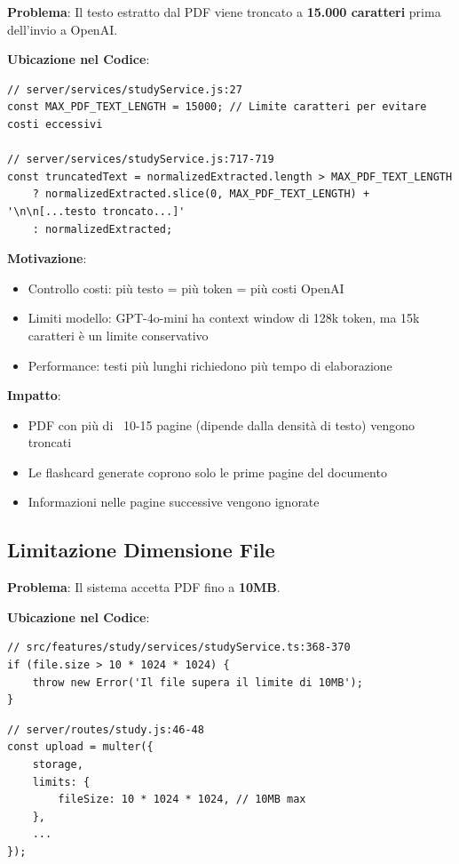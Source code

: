\documentclass[11pt,a4paper]{article}
\begin{document}
\textbf{Problema}: Il testo estratto dal PDF viene troncato a \textbf{15.000 caratteri} prima dell'invio a OpenAI.

\textbf{Ubicazione nel Codice}:
\begin{lstlisting}[caption=Costante e Troncamento Testo]
// server/services/studyService.js:27
const MAX_PDF_TEXT_LENGTH = 15000; // Limite caratteri per evitare costi eccessivi

// server/services/studyService.js:717-719
const truncatedText = normalizedExtracted.length > MAX_PDF_TEXT_LENGTH 
    ? normalizedExtracted.slice(0, MAX_PDF_TEXT_LENGTH) + '\n\n[...testo troncato...]'
    : normalizedExtracted;
\end{lstlisting}

\textbf{Motivazione}:
\begin{itemize}
    \item Controllo costi: più testo = più token = più costi OpenAI
    \item Limiti modello: GPT-4o-mini ha context window di 128k token, ma 15k caratteri è un limite conservativo
    \item Performance: testi più lunghi richiedono più tempo di elaborazione
\end{itemize}

\textbf{Impatto}:
\begin{itemize}
    \item PDF con più di ~10-15 pagine (dipende dalla densità di testo) vengono troncati
    \item Le flashcard generate coprono solo le prime pagine del documento
    \item Informazioni nelle pagine successive vengono ignorate
\end{itemize}

\subsection{Limitazione Dimensione File}

\textbf{Problema}: Il sistema accetta PDF fino a \textbf{10MB}.

\textbf{Ubicazione nel Codice}:
\begin{lstlisting}[caption=Validazione Dimensione File - Frontend]
// src/features/study/services/studyService.ts:368-370
if (file.size > 10 * 1024 * 1024) {
    throw new Error('Il file supera il limite di 10MB');
}
\end{lstlisting}

\begin{lstlisting}[caption=Validazione Dimensione File - Backend]
// server/routes/study.js:46-48
const upload = multer({
    storage,
    limits: {
        fileSize: 10 * 1024 * 1024, // 10MB max
    },
    ...
});
\end{lstlisting}
\end{document}
